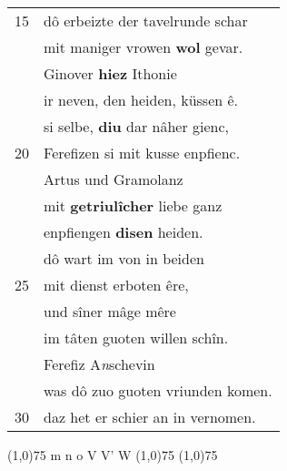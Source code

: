 \documentclass[8pt,a4paper,notitlepage]{article}
\begin{document}
\begin{table}[ht]
\begin{minipage}[t]{0.5\linewidth}
\begin{tabular}{rl}
15 & dô erbeizte der tavelrunde schar\\ 
 & mit maniger vrowen \textbf{wol} gevar.\\ 
 & Ginover \textbf{hiez} Ithonie\\ 
 & ir neven, den heiden, küssen ê.\\ 
 & si selbe, \textbf{diu} dar nâher gienc,\\ 
20 & Ferefizen si mit kusse enpfienc.\\ 
 & Artus und Gramolanz\\ 
 & mit \textbf{getriulîcher} liebe ganz\\ 
 & enpfiengen \textbf{disen} heiden.\\ 
 & dô wart im von in beiden\\ 
25 & mit dienst erboten êre,\\ 
 & und sîner mâge mêre\\ 
 & im tâten guoten willen schîn.\\ 
 & Ferefiz A\textit{n}schevin\\ 
 & was dô zuo guoten vriunden komen.\\ 
30 & daz het er schier an in vernomen.\\ 
\end{tabular}
\scriptsize
\line(1,0){75} \newline
m n o V V' W \newline
\line(1,0){75} \newline
\newline
\line(1,0){75} \newline

\end{minipage}
\end{table}
\end{document}
